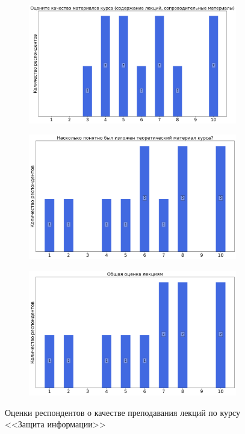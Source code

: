 \begin{figure}[H]
\begin{subfigure}[b]{0.45\textwidth}
				\includegraphics[width=\textwidth]{images/4 course/Защита информации/lecturer-marks-Колыбельников А.И.-1.png}
			\end{subfigure}
			\begin{subfigure}[b]{0.45\textwidth}
				\centering
				\includegraphics[width=\textwidth]{images/4 course/Защита информации/lecturer-marks-Колыбельников А.И.-2.png}
			\end{subfigure}	
			\begin{subfigure}[b]{0.45\textwidth}
				\centering
				\includegraphics[width=\textwidth]{images/4 course/Защита информации/lecturer-marks-Колыбельников А.И.-3.png}
			\end{subfigure}
			\caption{Оценки респондентов о качестве преподавания лекций по курсу <<Защита информации>>}
		\end{figure}


